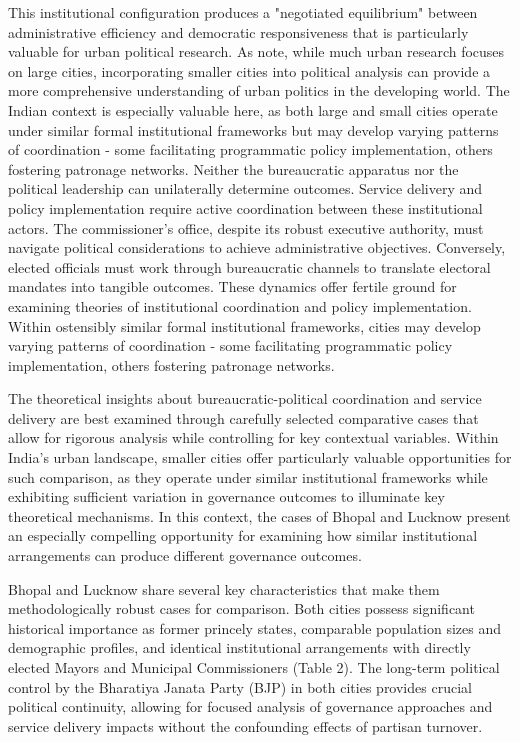 This institutional configuration produces a "negotiated equilibrium" between administrative efficiency and democratic responsiveness that is particularly valuable for urban political research. As \citep{kumar_why_2023} note, while much urban research focuses on large cities, incorporating smaller cities into political analysis can provide a more comprehensive understanding of urban politics in the developing world. The Indian context is especially valuable here, as both large and small cities operate under similar formal institutional frameworks but may develop varying patterns of coordination - some facilitating programmatic policy implementation, others fostering patronage networks. Neither the bureaucratic apparatus nor the political leadership can unilaterally determine outcomes. Service delivery and policy implementation require active coordination between these institutional actors. The commissioner's office, despite its robust executive authority, must navigate political considerations to achieve administrative objectives. Conversely, elected officials must work through bureaucratic channels to translate electoral mandates into tangible outcomes. These dynamics offer fertile ground for examining theories of institutional coordination and policy implementation. Within ostensibly similar formal institutional frameworks, cities may develop varying patterns of coordination - some facilitating programmatic policy implementation, others fostering patronage networks. 

The theoretical insights about bureaucratic-political coordination and service delivery are best examined through carefully selected comparative cases that allow for rigorous analysis while controlling for key contextual variables. Within India's urban landscape, smaller cities offer particularly valuable opportunities for such comparison, as they operate under similar institutional frameworks while exhibiting sufficient variation in governance outcomes to illuminate key theoretical mechanisms. In this context, the cases of Bhopal and Lucknow present an especially compelling opportunity for examining how similar institutional arrangements can produce different governance outcomes.

Bhopal and Lucknow share several key characteristics that make them methodologically robust cases for comparison. Both cities possess significant historical importance as former princely states, comparable population sizes and demographic profiles, and identical institutional arrangements with directly elected Mayors and Municipal Commissioners (Table 2). The long-term political control by the Bharatiya Janata Party (BJP) in both cities provides crucial political continuity, allowing for focused analysis of governance approaches and service delivery impacts without the confounding effects of partisan turnover.

